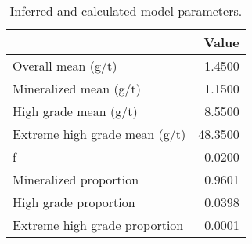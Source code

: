 \begin{table}
\centering
\caption{Inferred and calculated model parameters.}
\label{tab:ehg_model}
\begin{tabular}{lr}
\toprule
{} &    Value \\
\midrule
Overall mean (g/t)            &   1.4500 \\
Mineralized mean (g/t)        &   1.1500 \\
High grade mean (g/t)         &   8.5500 \\
Extreme high grade mean (g/t) &  48.3500 \\
f                           &   0.0200 \\
Mineralized proportion        &   0.9601 \\
High grade proportion         &   0.0398 \\
Extreme high grade proportion &   0.0001 \\
\bottomrule
\end{tabular}
\end{table}
